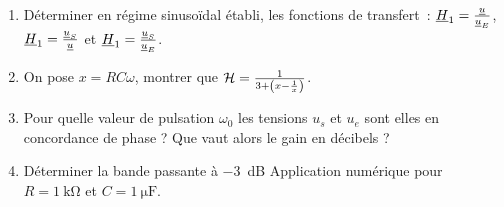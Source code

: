 \begin{exercice}
	\begin{enumerate}
		\item Déterminer en régime sinusoïdal établi, les fonctions de transfert~: \(\underline{H}_1 = \frac{\underline{u}}{\underline{u}_E}\), \(\underline{H}_1 = \frac{\underline{u}_S}{\underline{u}}\) et \(\underline{H}_1 = \frac{\underline{u}_S}{\underline{u}_E}\).
		\item On pose \(x = R C \omega\), montrer que \(\mathcal{H} = \frac{1}{3+\left(x-\frac{1}{x} \right)}\).
		\item Pour quelle valeur de pulsation \(\omega_0\) les tensions \(u_s\) et \(u_e\) sont elles en concordance de phase ? Que vaut alors le gain en décibels ?
		\item Déterminer la bande passante à \SI{-3}{\dB} Application numérique pour \(R = \SI{1}{\kilo\ohm}\) et \(C = \SI{1}{\micro\farad}\). 
	\end{enumerate}
\end{exercice}
